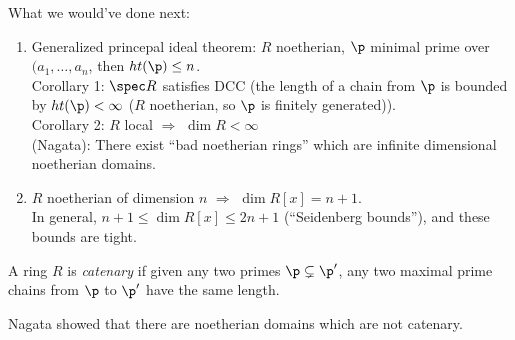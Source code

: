  What we would've done next:
 \begin{enumerate}
   \item Generalized princepal ideal theorem: $R$ noetherian, $\p$ minimal prime over
   $(a_1,\dots, a_n$, then $ht(\p)\le n$.\\
   Corollary 1: $\spec R$ satisfies DCC (the length of a chain from $\p$ is bounded by
   $ht(\p)< \infty$ ($R$ noetherian, so $\p$ is finitely generated)).\\
   Corollary 2: $R$ local $\Rightarrow$ $\dim R< \infty$\\
   (Nagata): There exist ``bad noetherian rings'' which are infinite dimensional noetherian
   domains.

   \item $R$ noetherian of dimension $n$ $\Longrightarrow$ $\dim R[x] = n+1$.\\
   In general, $n+1\le \dim R[x] \le 2n+1$ (``Seidenberg bounds''), and these bounds are
   tight.
 \end{enumerate}

 \begin{definition}
   A ring $R$ is \emph{catenary} if given any two primes $\p\subsetneq \p'$, any two
   maximal prime chains from $\p$ to $\p'$ have the same length.
 \end{definition}
 Nagata showed that there are noetherian domains which are not catenary.

